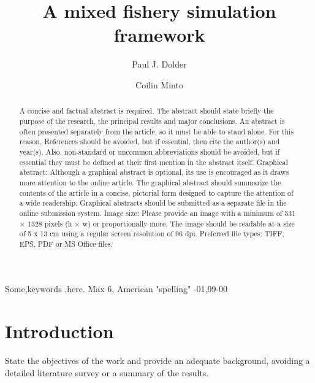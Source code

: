\documentclass[review]{elsarticle}
\begin{document}
\begin{frontmatter}

\title{A mixed fishery simulation framework}

\author[1,2]{Paul J. Dolder}

\author[1]{Coilin Minto}

\address[1]{Galway-Mayo Institute of Technology (GMIT), Dublin Road, Galway,
	Ireland} 
\address[2]{Centre for Environment, Fisheries and Aquaculture Science (Cefas),
	Pakefield Road, Lowestoft, UK}

\begin{abstract}
A concise and factual abstract is required. The abstract should state briefly
the purpose of the research, the principal results and major conclusions. An
abstract is often presented separately from the article, so it must be able to
stand alone. For this reason, References should be avoided, but if essential,
then cite the author(s) and year(s). Also, non-standard or uncommon
abbreviations should be avoided, but if essential they must be defined at their
first mention in the abstract itself.  
Graphical abstract: Although a graphical abstract is optional, its use is
encouraged as it draws more attention to the online article. The graphical
abstract should summarize the contents of the article in a concise, pictorial
form designed to capture the attention of a wide readership. Graphical
abstracts should be submitted as a separate file in the online submission
system. Image size: Please provide an image with a minimum of 531 × 1328 pixels
(h × w) or proportionally more. The image should be readable at a size of 5 x
13 cm using a regular screen resolution of 96 dpi.  Preferred file types: TIFF,
EPS, PDF or MS Office files.
\end{abstract}

\begin{keyword}
Some\sep keywords \sep here. Max 6, American "spelling" 
-01\sep  99-00
\end{keyword}

\end{frontmatter}

\linenumbers

\section{Introduction}

State the objectives of the work and provide an adequate background, avoiding a
detailed literature survey or a summary of the results.
\end{document}
